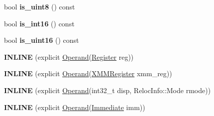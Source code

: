 \begin{DoxyCompactItemize}
\item 
bool {\bfseries is\+\_\+uint8} () const \hypertarget{classv8_1_1internal_1_1_b_a_s_e___e_m_b_e_d_d_e_d_a2b622b5258b0f3e61396697f606393d2}{}\label{classv8_1_1internal_1_1_b_a_s_e___e_m_b_e_d_d_e_d_a2b622b5258b0f3e61396697f606393d2}

\item 
bool {\bfseries is\+\_\+int16} () const \hypertarget{classv8_1_1internal_1_1_b_a_s_e___e_m_b_e_d_d_e_d_afaffb920765174ddf6ceb8088c1f361f}{}\label{classv8_1_1internal_1_1_b_a_s_e___e_m_b_e_d_d_e_d_afaffb920765174ddf6ceb8088c1f361f}

\item 
bool {\bfseries is\+\_\+uint16} () const \hypertarget{classv8_1_1internal_1_1_b_a_s_e___e_m_b_e_d_d_e_d_a66ea90d6435c5a9026d852a03fc29d9a}{}\label{classv8_1_1internal_1_1_b_a_s_e___e_m_b_e_d_d_e_d_a66ea90d6435c5a9026d852a03fc29d9a}

\item 
{\bfseries I\+N\+L\+I\+NE} (explicit \hyperlink{classv8_1_1internal_1_1_operand}{Operand}(\hyperlink{structv8_1_1internal_1_1_register}{Register} reg))\hypertarget{classv8_1_1internal_1_1_b_a_s_e___e_m_b_e_d_d_e_d_ae57bef63a3ea912f3b8d4a5a46e03a70}{}\label{classv8_1_1internal_1_1_b_a_s_e___e_m_b_e_d_d_e_d_ae57bef63a3ea912f3b8d4a5a46e03a70}

\item 
{\bfseries I\+N\+L\+I\+NE} (explicit \hyperlink{classv8_1_1internal_1_1_operand}{Operand}(\hyperlink{structv8_1_1internal_1_1_double_register}{X\+M\+M\+Register} xmm\+\_\+reg))\hypertarget{classv8_1_1internal_1_1_b_a_s_e___e_m_b_e_d_d_e_d_a8e3629173261b9dc5882ff0429b9eb4c}{}\label{classv8_1_1internal_1_1_b_a_s_e___e_m_b_e_d_d_e_d_a8e3629173261b9dc5882ff0429b9eb4c}

\item 
{\bfseries I\+N\+L\+I\+NE} (explicit \hyperlink{classv8_1_1internal_1_1_operand}{Operand}(int32\+\_\+t disp, Reloc\+Info\+::\+Mode rmode))\hypertarget{classv8_1_1internal_1_1_b_a_s_e___e_m_b_e_d_d_e_d_af79379acd1c81ab31a7d4b3d0560d6c9}{}\label{classv8_1_1internal_1_1_b_a_s_e___e_m_b_e_d_d_e_d_af79379acd1c81ab31a7d4b3d0560d6c9}

\item 
{\bfseries I\+N\+L\+I\+NE} (explicit \hyperlink{classv8_1_1internal_1_1_operand}{Operand}(\hyperlink{classv8_1_1internal_1_1_immediate}{Immediate} imm))\hypertarget{classv8_1_1internal_1_1_b_a_s_e___e_m_b_e_d_d_e_d_a91ec35034325008409055687a188e698}{}\label{classv8_1_1internal_1_1_b_a_s_e___e_m_b_e_d_d_e_d_a91ec35034325008409055687a188e698}


\end{DoxyCompactItemize}

